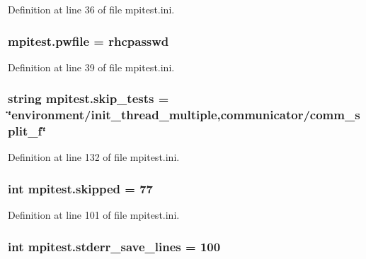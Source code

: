 Definition at line 36 of file mpitest.\-ini.

\hypertarget{namespacempitest_a4d126335ef307f44645da8ff58e86927}{
\subsubsection[{pwfile}]{\setlength{\rightskip}{0pt plus 5cm}mpitest.\-pwfile = rhcpasswd}}\label{namespacempitest_a4d126335ef307f44645da8ff58e86927}


Definition at line 39 of file mpitest.\-ini.

\hypertarget{namespacempitest_ac08f02520db8234e89010050fa3b76ea}{
\subsubsection[{skip\-\_\-tests}]{\setlength{\rightskip}{0pt plus 5cm}string mpitest.\-skip\-\_\-tests = \char`\"{}environment/init\-\_\-thread\-\_\-multiple,communicator/comm\-\_\-split\-\_\-f\char`\"{}}}\label{namespacempitest_ac08f02520db8234e89010050fa3b76ea}


Definition at line 132 of file mpitest.\-ini.

\hypertarget{namespacempitest_a85870f11cfd9d17b34964ec12302c3bb}{
\subsubsection[{skipped}]{\setlength{\rightskip}{0pt plus 5cm}int mpitest.\-skipped = 77}}\label{namespacempitest_a85870f11cfd9d17b34964ec12302c3bb}


Definition at line 101 of file mpitest.\-ini.

\hypertarget{namespacempitest_a359e155a689c5604a331d2450976d0fa}{
\subsubsection[{stderr\-\_\-save\-\_\-lines}]{\setlength{\rightskip}{0pt plus 5cm}int mpitest.\-stderr\-\_\-save\-\_\-lines = 100}}\label{namespacempitest_a359e155a689c5604a331d2450976d0fa}


